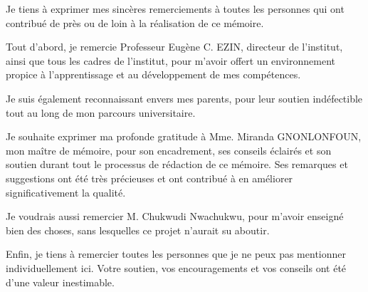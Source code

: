 \remerciements

Je tiens à exprimer mes sincères remerciements à toutes les personnes qui ont contribué de près ou de loin à la réalisation de ce mémoire. 

Tout d'abord, je remercie Professeur Eugène C. EZIN, directeur de l'institut, ainsi que tous les cadres de l'institut, pour m'avoir offert un environnement propice à l'apprentissage et au développement de mes compétences. 

Je suis également reconnaissant envers mes parents, pour leur soutien indéfectible tout au long de mon parcours universitaire.

Je souhaite exprimer ma profonde gratitude à Mme. Miranda \mbox{GNONLONFOUN}, mon maître de mémoire, pour son encadrement, 
ses conseils éclairés et son soutien durant tout le processus de rédaction de ce mémoire. 
Ses remarques et suggestions ont été très précieuses et ont contribué à en améliorer significativement la qualité.

Je voudrais aussi remercier M. Chukwudi Nwachukwu, pour m'avoir enseigné bien des choses, sans lesquelles ce projet n'aurait su aboutir.

Enfin, je tiens à remercier toutes les personnes que je ne peux pas mentionner individuellement ici. 
Votre soutien, vos encouragements et vos conseils ont été d'une valeur inestimable.